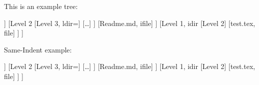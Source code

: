 \documentclass{article}
\begin{document}
This is an example tree:

\begin{fancydir}
[Toplevel
    [Level 1, dir=green!80!black
        [Level 2
            [Level 3]
            [Another file, cfile={purple}{X}]
        ]
        [Level 2
            [Level 3, ldir={\faApple}]
            [\ldots]
        ]
        [Readme.md, ifile]
    ]
    [Level 1, idir
        [Level 2]
        [test.tex, file]
    ]
]
\end{fancydir}

Same-Indent example:

\SetFolderFileSameIndent
\begin{fancydir}
    [Toplevel
        [Level 1, dir=green!80!black
            [Level 2
                [Level 3]
                [Another file, cfile={purple}{X}]
            ]
            [Level 2
                [Level 3, ldir={\faApple}]
                [\ldots]
            ]
            [Readme.md, ifile]
        ]
        [Level 1, idir
            [Level 2]
            [test.tex, file]
        ]
    ]
    \end{fancydir}
\end{document}
